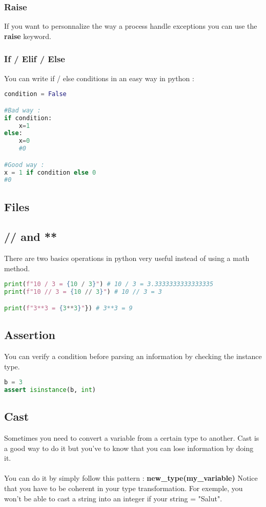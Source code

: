 \documentclass[a4paper, 12pt]{article}
\begin{document}
\subsubsection{Raise}
\label{Raise}
If you want to personnalize the way a process handle exceptions you can use the \textbf{raise} keyword.


\subsubsection{If / Elif / Else}
\label{IEE}
You can write if / else conditions in an easy way in python :
\begin{lstlisting}[language=Python]
condition = False

#Bad way :
if condition:
	x=1
else:
	x=0
	#0

#Good way :
x = 1 if condition else 0
#0
\end{lstlisting}

\subsection{Files}

\subsection{// and **}
There are two basics operations in python very useful instead of using a math method.
\begin{lstlisting}[language=Python]
print(f"10 / 3 = {10 / 3}") # 10 / 3 = 3.3333333333333335
print(f"10 // 3 = {10 // 3}") # 10 // 3 = 3

print(f"3**3 = {3**3}"}) # 3**3 = 9
\end{lstlisting}

\subsection{Assertion}
\label{subsec:Assertion}
You can verify a condition before parsing an information by checking the instance type.
\begin{lstlisting}[language=Python]
b = 3
assert isinstance(b, int)
\end{lstlisting}

\subsection{Cast}
Sometimes you need to convert a variable from a certain type to another. Cast is a good way to do it but you've to know that you can lose information by doing it. \\ \\
You can do it by simply follow this pattern : \textbf{new\_type(my\_variable)}
Notice that you have to be coherent in your type transformation. For exemple, you won't be able to cast a string into an integer if your string = "Salut".
\end{document}
